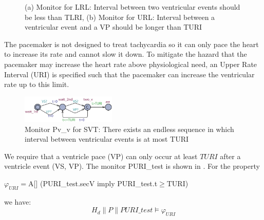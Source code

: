 \begin{figure}[t]
\centering
	\caption{(a) Monitor for LRL: Interval between two ventricular events should be less than TLRI, (b) Monitor for URL: Interval between a ventricular event and a VP should be longer than TURI}
\vspace{-10pt}
\end{figure} 

The pacemaker is not designed to treat tachycardia so it can only pace the heart to increase its rate and cannot slow it down. To mitigate the hazard that the pacemaker may increase the heart rate above physiological need, an Upper Rate Interval (URI) is specified such that the pacemaker can increase the ventricular rate up to this limit. 

\begin{figure}[b]
		\centering
		\includegraphics[width=0.4\textwidth]{figs/vv.pdf}
		\caption{\small Monitor \textsf{Pv\_v} for SVT: There exists an endless sequence in which interval between ventricular events is at most TURI}
		\label{fig:vv}
\end{figure}
  
We require that a ventricle pace (VP) can only occur at least $TURI$ after a ventricle event (VS, VP). The monitor \textsf{PURI\_test} is shown in . For the property
\begin{center}
$\varphi_{URI}=$\textsf{A[] (PURI\_test.secV imply PURI\_test.t$\geq$TURI)}
\end{center}
we have: $$H_d\| P\| PURI\_test\models \varphi_{URI}$$

